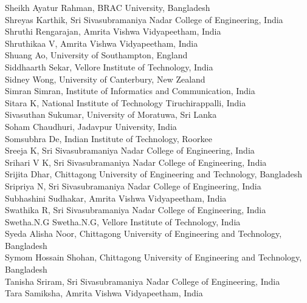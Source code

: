 \documentclass[11pt,oneside]{book}
\begin{document}
\begin{description}
          Sheikh Ayatur Rahman, BRAC University, Bangladesh\\
          Shreyas Karthik, Sri Sivasubramaniya Nadar College of Engineering, India\\
          Shruthi Rengarajan, Amrita Vishwa Vidyapeetham, India\\
          Shruthikaa V, Amrita Vishwa Vidyapeetham, India\\
          Shuang Ao, University of Southampton, England\\
          Siddhaarth Sekar, Vellore Institute of Technology, India\\
          Sidney Wong, University of Canterbury, New Zealand\\
          Simran Simran, Institute of Informatics and Communication, India\\
          Sitara K, National Institute of Technology Tiruchirappalli, India\\
          Sivasuthan Sukumar, University of Moratuwa, Sri Lanka\\
          Soham Chaudhuri, Jadavpur University, India\\
          Somsubhra De, Indian Institute of Technology, Roorkee\\
          Sreeja K, Sri Sivasubramaniya Nadar College of Engineering, India\\
          Srihari V K, Sri Sivasubramaniya Nadar College of Engineering, India\\
          Srijita Dhar, Chittagong University of Engineering and Technology, Bangladesh\\
          Sripriya N, Sri Sivasubramaniya Nadar College of Engineering, India\\
          Subhashini Sudhakar, Amrita Vishwa Vidyapeetham, India\\
          Swathika R, Sri Sivasubramaniya Nadar College of Engineering, India\\
          Swetha.N.G Swetha.N.G, Vellore Institute of Technology, India\\
          Syeda Alisha Noor, Chittagong University of Engineering and Technology, Bangladesh\\
          Symom Hossain Shohan, Chittagong University of Engineering and Technology, Bangladesh\\
          Tanisha Sriram, Sri Sivasubramaniya Nadar College of Engineering, India\\
          Tara Samiksha, Amrita Vishwa Vidyapeetham, India\\

\end{description}
\end{document}
